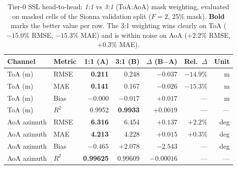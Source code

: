 
\begin{table}[t]
\centering
\caption{Tier-0 SSL head-to-head: \emph{1:1} vs \emph{3:1} (ToA:AoA) mask
weighting, evaluated on masked cells of the Sionna validation split
($F{=}2$, 25\% mask). \textbf{Bold} marks the better value per row.
The 3:1 weighting wins clearly on ToA ($-15.0\%$ RMSE, $-15.3\%$ MAE)
and is within noise on AoA ($+2.2\%$ RMSE, $+0.3\%$ MAE).}
\label{tab:tier0_headtohead}
\small
\begin{tabular}{ll rrr r r}
\toprule
Channel & Metric & {1:1 (A)} & {3:1 (B)} & {$\Delta$ (B$-$A)} & {Rel.\ $\Delta$} & Unit \\
\midrule
ToA (m)     & RMSE & \textbf{0.211} & 0.248 & $-0.037$ & $-14.9\%$ & m \\
ToA (m)     & MAE  & \textbf{0.141} & 0.167 & $-0.026$ & $-15.3\%$ & m \\
ToA (m)     & Bias & $-0.000$ & $-0.017$ & $+0.017$ & --- & m \\
ToA (m)     & $R^2$ & 0.9952 & \textbf{0.9933} & $+0.0019$ & --- & --- \\
\addlinespace
AoA azimuth & RMSE & \textbf{6.316} & 6.454 & $+0.137$ & $+2.2\%$ & deg \\
AoA azimuth & MAE  & \textbf{4.213} & 4.228 & $+0.015$ & $+0.3\%$ & deg \\
AoA azimuth & Bias & $-0.465$ & $+2.078$ & $-2.543$ & --- & deg \\
AoA azimuth & $R^2$ & \textbf{0.99625} & 0.99609 & $-0.00016$ & --- & --- \\
\bottomrule
\end{tabular}
\end{table}

